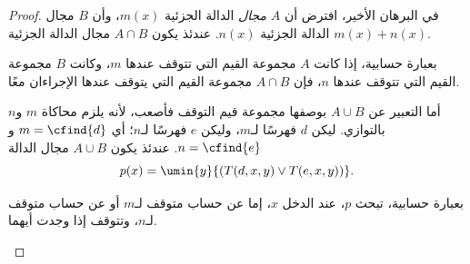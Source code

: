\documentclass[../../../include/open-logic-section]{subfiles}
\begin{document}
\begin{proof}
في البرهان الأخير، افترض أن $A$ \emph{مجال} الدالة الجزئية $m(x)$،
وأن $B$ مجال الدالة الجزئية $n(x)$. عندئذ يكون $A\cap B$ مجال الدالة
الجزئية $m(x)+n(x)$.

\begin{explain}
بعبارة حسابية، إذا كانت $A$ مجموعة القيم التي تتوقف عندها $m$، وكانت
$B$ مجموعة القيم التي تتوقف عندها $n$، فإن $A\cap B$ مجموعة القيم
التي يتوقف عندها الإجراءان معًا.
\end{explain}

أما التعبير عن $A\cup B$ بوصفها مجموعة قيم التوقف فأصعب، لأنه يلزم
محاكاة $m$ و$n$ بالتوازي. ليكن $d$ فهرسًا لـ$m$، وليكن $e$ فهرسًا
لـ$n$؛ أي $m=\cfind{d}$ و$n=\cfind{e}$. عندئذ يكون $A\cup B$ مجال
الدالة
\[
p(x) = \umin{y}{(T(d,x,y) \lor T(e,x,y))}.
\]
\begin{explain}
بعبارة حسابية، تبحث $p$، عند الدخل $x$، إما عن حساب متوقف لـ$m$ أو عن
حساب متوقف لـ$n$، وتتوقف إذا وجدت أيهما.
\end{explain}
\end{proof}
\end{document}
